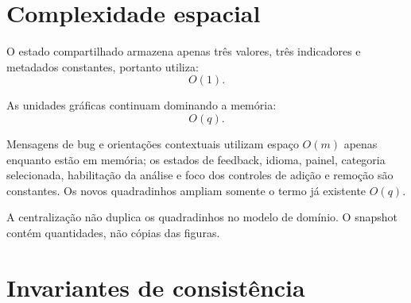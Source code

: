 \documentclass[12pt,a4paper]{article}
\begin{document}
\section{Complexidade espacial}

O estado compartilhado armazena apenas três valores, três indicadores e metadados constantes, portanto utiliza:
\[
O(1).
\]

As unidades gráficas continuam dominando a memória:
\[
O(q).
\]

Mensagens de bug e orientações contextuais utilizam espaço $O(m)$ apenas enquanto estão em memória; os estados de feedback, idioma, painel, categoria selecionada, habilitação da análise e foco dos controles de adição e remoção são constantes. Os novos quadradinhos ampliam somente o termo já existente $O(q)$.

A centralização não duplica os quadradinhos no modelo de domínio. O snapshot contém quantidades, não cópias das figuras.

\section{Invariantes de consistência}
\end{document}
